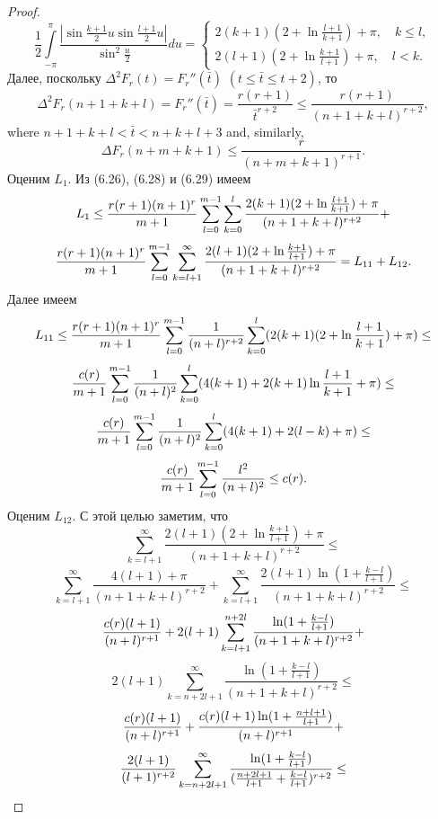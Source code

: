 \begin{proof}
\begin{equation}\label{6.28}
    \frac12\int\limits_{-\pi}^{\pi}\frac{|\sin\frac{k+1}{2}u\sin\frac{l+1}{2}u|}{\sin^2\frac u2}du=
\begin{cases}
2(k+1)(2+\ln\frac{l+1}{k+1})+\pi,\quad k\le l,   \\
2(l+1)(2+\ln\frac{k+1}{l+1})+\pi, \quad l<k.
\end{cases}
\end{equation}
Далее, поскольку $\Delta^2F_r(t)=F_r''(\bar{t})$ $(t\le\bar{t}\le t+2)$, то
\begin{equation}\label{6.29}
   \Delta^2F_r(n+1+k+l)=F_r''(\bar{t})=
\frac{r(r+1)}{\bar{t}^{r+2}}\le\frac{r(r+1)}{(n+1+k+l)^{r+2}},
\end{equation}
where $n+1+k+l<\bar{t}<n+k+l+3$ and, similarly,
\begin{equation}\label{6.30}
    \Delta F_r(n+m+k+1)\le\frac{r}{(n+m+k+1)^{r+1}}.
\end{equation}
Оценим $L_1$. Из (6.26), (6.28) и (6.29) имеем
$$
L_1\le {r(r+1)(n+1)^r\over m+1}\sum_{l=0}^{m-1}\sum\limits_{k=0}^l\frac{2(k+1)(2+\ln\frac{l+1}{k+1})+\pi}{(n+1+k+l)^{r+2}}+ $$
\begin{equation}\label{6.31}
{r(r+1)(n+1)^r\over m+1}\sum_{l=0}^{m-1}\sum\limits_{k=l+1}^\infty\frac{2(l+1)(2+\ln\frac{k+1}{l+1})+\pi}{(n+1+k+l)^{r+2}}=L_{11}+L_{12}.
  \end{equation}
  Далее имеем
  $$
  L_{11}\le {r(r+1)(n+1)^r\over m+1}\sum_{l=0}^{m-1}\frac{1}{(n+l)^{r+2}}\sum\limits_{k=0}^l(2(k+1)(2+\ln\frac{l+1}{k+1})+\pi)\le
  $$
$$
  {c(r)\over m+1}\sum_{l=0}^{m-1}\frac{1}{(n+l)^{2}}\sum\limits_{k=0}^l(4(k+1)+2(k+1)\ln\frac{l+1}{k+1}+\pi)\le
  $$
$$
  {c(r)\over m+1}\sum_{l=0}^{m-1}\frac{1}{(n+l)^{2}}\sum\limits_{k=0}^l(4(k+1)+2(l-k)+\pi)\le
  $$
\begin{equation}\label{6.32}
    {c(r)\over m+1}\sum_{l=0}^{m-1}\frac{l^2}{(n+l)^{2}}\le c(r).
\end{equation}
Оценим $L_{12}$. С этой целью заметим, что
$$
\sum\limits_{k=l+1}^\infty\frac{2(l+1)(2+\ln\frac{k+1}{l+1})+\pi}{(n+1+k+l)^{r+2}}\le
$$
$$
\sum\limits_{k=l+1}^\infty\frac{4(l+1)+\pi}{(n+1+k+l)^{r+2}}+
\sum\limits_{k=l+1}^\infty\frac{2(l+1)\ln(1+\frac{k-l}{l+1})}{(n+1+k+l)^{r+2}}\le
$$
$$
{c(r)(l+1)\over(n+l)^{r+1}}+2(l+1)\sum\limits_{k=l+1}^{n+2l}\frac{\ln(1+\frac{k-l}{l+1})}{(n+1+k+l)^{r+2}}+
$$
$$
2(l+1)\sum\limits_{k=n+2l+1}^\infty\frac{\ln(1+\frac{k-l}{l+1})}{(n+1+k+l)^{r+2}}\le
$$
$$
{c(r)(l+1)\over(n+l)^{r+1}}+{c(r)(l+1)\ln(1+\frac{n+l+1}{l+1})\over(n+l)^{r+1}}+
$$
$$
\frac{2(l+1)}{(l+1)^{r+2}}\sum\limits_{k=n+2l+1}^\infty\frac{\ln(1+\frac{k-l}{l+1})}{({n+2l+1\over l+1}+{k-l\over l+1})^{r+2}}\le
$$
\end{proof}
